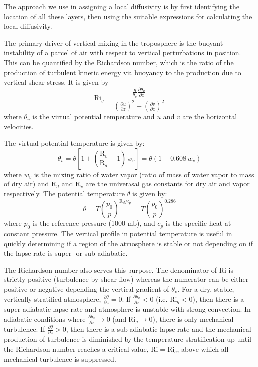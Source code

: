 The approach we use in assigning a local diffusivity is by first identifying the location
of all these layers, then using the suitable expressions for calculating the local
diffusivity.

The primary driver of vertical mixing in the troposphere is the buoyant instability of a parcel
of air with respect to vertical perturbations in position. This can be quantified
by the Richardson number, which is the ratio of the production of turbulent
kinetic energy via buoyancy to the production due to vertical shear stress.
It is given by
\begin{equation}
\mathrm{Ri}_g = \frac{\frac{g}{\theta_v}\frac{\partial \theta_v}{\partial z}}
{\left( \frac{\partial u}{\partial z}\right)^2 + \left( \frac{\partial v}{\partial z}\right)^2}
\end{equation}
where $\theta_v$ is the virtual potential temperature and $u$ and $v$ are the horizontal velocities.

The virtual potential temperature is given by:
\begin{equation}
\theta_v = \theta \left[ 1 + \left( \frac{\mathrm{R}_{v}}{\mathrm{R}_{d}}-1\right) \, w_v \right] = \theta \left( 1 + 0.608 \, w_v \right)
\end{equation}
where $w_v$ is the mixing ratio of water vapor
(ratio of mass of water vapor to mass of dry air) %
and $\mathrm{R}_{d}$ and $\mathrm{R}_{v}$ are the univerasal gas constants for dry air and vapor respectively.
The potential temperature $\theta$ is given by:
\begin{equation}
\theta = T \left( \frac{p_0}{p}\right)^{\mathrm{R}_{d}/c_p} = T \left( \frac{p_0}{p}\right)^{0.286}
\end{equation}
where $p_0$ is the reference pressure (1000 $\mathrm{mb}$), and $c_p$ is the specific heat at constant pressure.
The vertical profile in potential temperature is useful in quickly determining if a region of the
atmosphere is stable or not depending on if the lapse rate is super- or sub-adiabatic.

The Richardson number also serves this purpose.
The denominator of $\mathrm{Ri}$ is strictly positive (turbulence by shear flow) whereas the numerator can be either
positive or negative depending the vertical gradient of $\theta_v$. For a dry, stable, vertically
stratified atmosphere, $\frac{\partial \theta}{\partial z}=0$.
If $\frac{\partial \theta_v}{\partial z}<0$ (i.e. $\mathrm{Ri}_g<0$), then there is a super-adiabatic lapse rate
and atmosphere is unstable with strong convection. In adiabatic conditions where
$\frac{\partial \theta_v}{\partial z} \rightarrow 0$ (and $\mathrm{Ri}_g \rightarrow 0$),
there is only mechanical turbulence. If $\frac{\partial \theta}{\partial z}>0$, then there
is a sub-adiabatic lapse rate and the mechanical production of turbulence is diminished by
the temperature stratification up until the Richardson number reaches a critical value,
$\mathrm{Ri} = \mathrm{Ri}_c$, above which all mechanical turbulence is suppressed.

